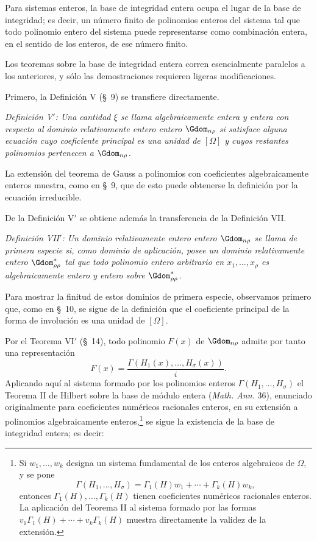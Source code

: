 \documentclass[11pt]{article}
\begin{document}
Para sistemas enteros, la base de integridad entera ocupa el lugar de la base de integridad; es decir, un número finito de polinomios enteros del sistema tal que todo polinomio entero del sistema puede representarse como combinación entera, en el sentido de los enteros, de ese número finito.

Los teoremas sobre la base de integridad entera corren esencialmente paralelos a los anteriores, y sólo las demostraciones requieren ligeras modificaciones.

Primero, la Definición V (\S\ 9) se transfiere directamente.

\emph{Definición V$'$: Una cantidad $\xi$ se llama algebraicamente entera y entera con respecto al dominio relativamente entero entero $\Gdom_{n\rho}$ si satisface alguna ecuación cuyo coeficiente principal es una unidad de $[\Omega]$ y cuyos restantes polinomios pertenecen a $\Gdom_{n\rho}$.}

La extensión del teorema de Gauss a polinomios con coeficientes algebraicamente enteros muestra, como en \S\ 9, que de esto puede obtenerse la definición por la ecuación irreducible.

De la Definición V$'$ se obtiene además la transferencia de la Definición VII.

\emph{Definición VII$'$: Un dominio relativamente entero entero $\Gdom_{n\rho}$ se llama de primera especie si, como dominio de aplicación, posee un dominio relativamente entero $\Gdom^*_{\rho\rho}$ tal que todo polinomio entero arbitrario en $x_1,\ldots,x_\rho$ es algebraicamente entero y entero sobre $\Gdom^*_{\rho\rho}$.}

Para mostrar la finitud de estos dominios de primera especie, observamos primero que, como en \S\ 10, se sigue de la definición que el coeficiente principal de la forma de involución es una unidad de $[\Omega]$.

Por el Teorema VI$'$ (\S\ 14), todo polinomio $F(x)$ de $\Gdom_{n\rho}$ admite por tanto una representación
\[
  F(x)=\frac{\Gamma(H_1(x),\ldots,H_\sigma(x))}{i}.
\]
Aplicando aquí al sistema formado por los polinomios enteros $\Gamma(H_1,\ldots,H_\sigma)$ el Teorema II de Hilbert sobre la base de módulo entera (\emph{Math. Ann.} 36), enunciado originalmente para coeficientes numéricos racionales enteros, en su extensión a polinomios algebraicamente enteros,\footnote{Si $w_1,\ldots,w_k$ designa un sistema fundamental de los enteros algebraicos de $\Omega$, y se pone
\[
  \Gamma(H_1,
\ldots,H_\sigma)=\Gamma_1(H)w_1+\cdots+\Gamma_k(H)w_k,
\]
entonces $\Gamma_1(H),\ldots,\Gamma_k(H)$ tienen coeficientes numéricos racionales enteros. La aplicación del Teorema II al sistema formado por las formas $v_1\Gamma_1(H)+\cdots+v_k\Gamma_k(H)$ muestra directamente la validez de la extensión.} se sigue la existencia de la base de integridad entera; es decir:
\end{document}
